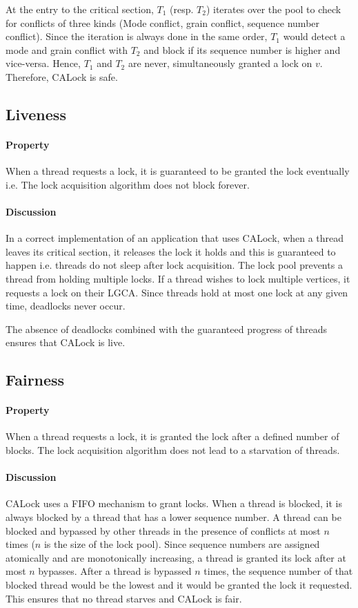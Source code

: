 At the entry to the critical section, $T_1$ (resp. $T_2$) iterates over the pool to check for conflicts of three kinds (Mode conflict, grain conflict, sequence number conflict). 
Since the iteration is always done in the same order, $T_1$ would detect a mode and grain conflict with $T_2$ and block if its sequence number is higher and vice-versa. 
Hence, $T_1$ and $T_2$ are never, simultaneously granted a lock on $v$. Therefore, CALock is safe.

\subsection[Liveness]{Liveness}
\paragraph{Property} When a thread requests a lock, it is guaranteed to be granted the lock eventually i.e. 
The lock acquisition algorithm does not block forever.

\paragraph{Discussion}
In a correct implementation of an application that uses CALock, when a thread leaves its critical section, it releases the lock it holds and this is guaranteed to happen i.e. threads do not sleep after lock acquisition.  
The lock pool prevents a thread from holding multiple locks. 
If a thread wishes to lock multiple vertices, it requests a lock on their LGCA. 
Since threads hold at most one lock at any given time, deadlocks never occur. 

The absence of deadlocks combined with the guaranteed progress of threads ensures that CALock is live. 

\subsection[Fairness]{Fairness}
\paragraph{Property} When a thread requests a lock, it is granted the lock after a defined number of blocks. 
The lock acquisition algorithm does not lead to a starvation of threads.

\paragraph{Discussion}
CALock uses a FIFO mechanism to grant locks. When a thread is blocked, it is always blocked by a thread that has a lower sequence number. 
A thread can be blocked and bypassed by other threads in the presence of conflicts at most $n$ times ($n$ is the size of the lock pool).  
Since sequence numbers are assigned atomically and are monotonically increasing, a thread is granted its lock after at most $n$ bypasses. 
After a thread is  bypassed $n$ times, the sequence number of that blocked thread would be the lowest and it would be granted the lock it requested. 
This ensures that no thread starves and CALock is fair.


